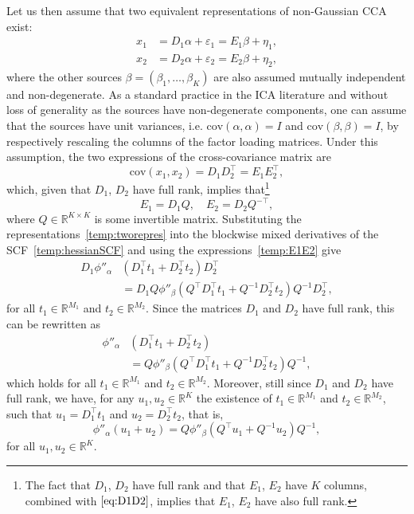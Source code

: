 \documentclass{article}
\newcommand{\R}{\mathbb{R}}
\newcommand{\cov}{\mathrm{cov}}
\begin{document}
Let us then assume that two equivalent representations of non-Gaussian CCA exist:
\begin{equation}\label{temp:tworepres}
\begin{aligned}
x_1 &= D_1 \alpha + \varepsilon_1 = E_1 \beta + \eta_1,\\
x_2 &= D_2 \alpha + \varepsilon_2 = E_2 \beta + \eta_2,
\end{aligned}
\end{equation}
where the other sources $\beta = (\beta_1, \ldots, \beta_K)$ are also assumed mutually independent and non-degenerate.
As a standard practice in the ICA literature and without loss of generality as the sources have non-degenerate components, one can assume that the sources have unit variances, i.e. $\cov(\alpha,\alpha)=I$ and $\cov(\beta, \beta)=I$, by respectively rescaling the columns of the factor loading matrices. Under this assumption, the two expressions of the cross-covariance matrix are
\begin{equation} \label{eq:D1D2}
\cov(x_1,x_2) = D_1D_2^{\top} = E_1 E_2^{\top},
\end{equation}
which, given that $D_1$, $D_2$ have full rank, 
implies that\footnote{The fact that $D_1$, $D_2$ have full rank and that $E_1$, $E_2$ have $K$ columns, combined with $\eqref{eq:D1D2}$, implies that $E_1$, $E_2$ have also full rank.}
\begin{equation}\label{temp:E1E2}
E_1 = D_1 Q, \quad E_2 = D_2 Q^{-\top},
\end{equation}
where $Q\in\R^{K\times K}$ is some invertible matrix. Substituting the representations~\eqref{temp:tworepres} into the blockwise mixed derivatives of the SCF~\eqref{temp:hessianSCF} and using the expressions~\eqref{temp:E1E2} give
$$
\begin{aligned}
D_1  \phi''_{\alpha} & (D_1^{\top}t_1 + D_2^{\top}t_2) D_2^{\top} \\
&= D_1 Q \phi''_{\beta} (Q^{\top} D_1^{\top} t_1 + Q^{-1}D_2^{\top}t_2) Q^{-1}D_2^{\top}, 
\end{aligned}
$$
for all $t_1\in\R^{M_1}$ and $t_2\in\R^{M_2}$. Since the matrices $D_1$ and $D_2$ have full rank, this can be rewritten as
$$
\begin{aligned}
 \phi''_{\alpha} & (D_1^{\top}t_1 + D_2^{\top}t_2) \\
&= Q \phi''_{\beta} (Q^{\top} D_1^{\top} t_1 + Q^{-1}D_2^{\top}t_2) Q^{-1},
\end{aligned}
$$
which holds for all $t_1\in\R^{M_1}$ and $t_2\in\R^{M_2}$. Moreover, still since $D_1$ and $D_2$ have full rank, we have, for any $u_1, u_2 \in \R^K$ the existence of   $t_1\in\R^{M_1}$ and $t_2\in\R^{M_2}$, such that $u_1 = D_1^\top t_1 $ and $u_2 = D_2^\top t_2$, that is,
\begin{equation}\label{temp:hessians-realtion}
 \phi''_{\alpha} (u_1 + u_2) = Q \phi''_{\beta} (Q^{\top} u_1 + Q^{-1}u_2) Q^{-1},
\end{equation}
for all $u_1,u_2\in\R^K$.
\end{document}
